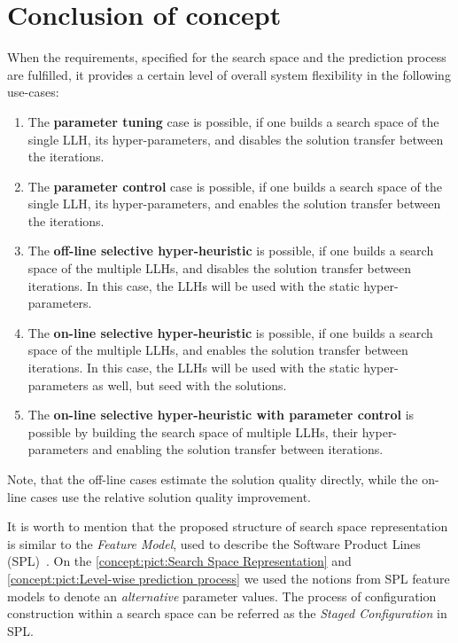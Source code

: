 \section{Conclusion of concept}
When the requirements, specified for the search space and the prediction process are fulfilled, it provides a certain level of overall system flexibility in the following use-cases:
\begin{enumerate}
	\item The \textbf{parameter tuning} case is possible, if one builds a search space of the single LLH, its hyper-parameters, and disables the solution transfer between the iterations.
	
	\item The \textbf{parameter control} case is possible, if one builds a search space of the single LLH, its hyper-parameters, and enables the solution transfer between the iterations. 
	
	\item The \textbf{off-line selective hyper-heuristic} is possible, if one builds a search space of the multiple LLHs, and disables the solution transfer between iterations. In this case, the LLHs will be used with the static hyper-parameters.
	
	\item The \textbf{on-line selective hyper-heuristic} is possible, if one builds a search space of the multiple LLHs, and enables the solution transfer between iterations. In this case, the LLHs will be used with the static hyper-parameters as well, but seed with the solutions.
	
	\item The \textbf{on-line selective hyper-heuristic with parameter control} is possible by building the search space of multiple LLHs, their hyper-parameters and enabling the solution transfer between iterations.
\end{enumerate}

Note, that the off-line cases estimate the solution quality directly, while the on-line cases use the relative solution quality improvement.

It is worth to mention that the proposed structure of search space representation is similar to the \emph{Feature Model}, used to describe the Software Product Lines (SPL)~\cite{schroeter2012multi}. On the \cref{concept:pict:Search Space Representation} and \cref{concept:pict:Level-wise prediction process} we used the notions from SPL feature models to denote an \emph{alternative} parameter values. The process of configuration construction within a search space can be referred as the \emph{Staged Configuration} in SPL.